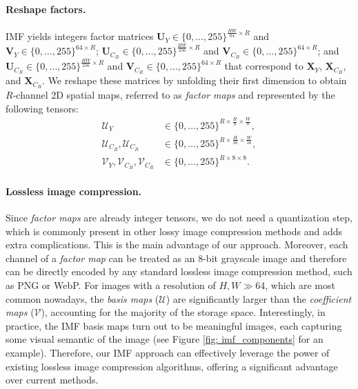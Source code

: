 \paragraph{Reshape factors.} 
IMF yields integers factor matrices $\bm{U}_{Y} \in \{0, \ldots, 255\}^{\frac{HW}{64} \times R}$ and $\bm{V}_{Y} \in \{0, \ldots, 255\}^{64 \times R}$; $\bm{U}_{C_B} \in \{0, \ldots, 255\}^{\frac{HW}{256} \times R}$ and $\bm{V}_{C_B} \in \{0, \ldots, 255\}^{64 \times R}$; and $\bm{U}_{C_R} \in \{0, \ldots, 255\}^{\frac{HW}{256} \times R}$ and $\bm{V}_{C_R} \in \{0, \ldots, 255\}^{64 \times R}$ that correspond to $\bm{X}_{Y}$, $\bm{X}_{C_B}$, and $\bm{X}_{C_R}$. We reshape these matrices by unfolding their first dimension to obtain $R$-channel 2D spatial maps, referred to as \emph{factor maps} and represented by the following tensors:
\begin{align} \label{eq: reshaped factors}
	\bm{\mathcal{U}}_{Y} & \in \{0, \ldots, 255\}^{R \times \frac{H}{8} \times \frac{W}{8}}, \nonumber \\
	\bm{\mathcal{U}}_{C_B}, \bm{\mathcal{U}}_{C_R} & \in \{0, \ldots, 255\}^{R \times \frac{H}{16} \times \frac{W}{16}}, \\
	\bm{\mathcal{V}}_{Y}, \bm{\mathcal{V}}_{C_B}, \bm{\mathcal{V}}_{C_R} & \in \{0, \ldots, 255\}^{R \times 8 \times 8}. \nonumber
\end{align}

\paragraph{Lossless image compression.}
Since \emph{factor maps} are already integer tensors, we do not need a quantization step, which is commonly present in other lossy image compression methods and adds extra complications. This is the main advantage of our approach. Moreover, each channel of a \emph{factor map} can be treated as an 8-bit grayscale image and therefore can be directly encoded by any standard lossless image compression method, such as PNG or WebP. For images with a resolution of $H, W \gg 64$, which are most common nowadays, the \emph{basis maps} ($\bm{\mathcal{U}}$) are significantly larger than the \emph{coefficient maps} ($\bm{\mathcal{V}}$), accounting for the majority of the storage space. Interestingly, in practice, the IMF basis maps turn out to be meaningful images, each capturing some visual semantic of the image (see Figure \ref{fig: imf_components} for an example). Therefore, our IMF approach can effectively leverage the power of existing lossless image compression algorithms, offering a significant advantage over current methods.

